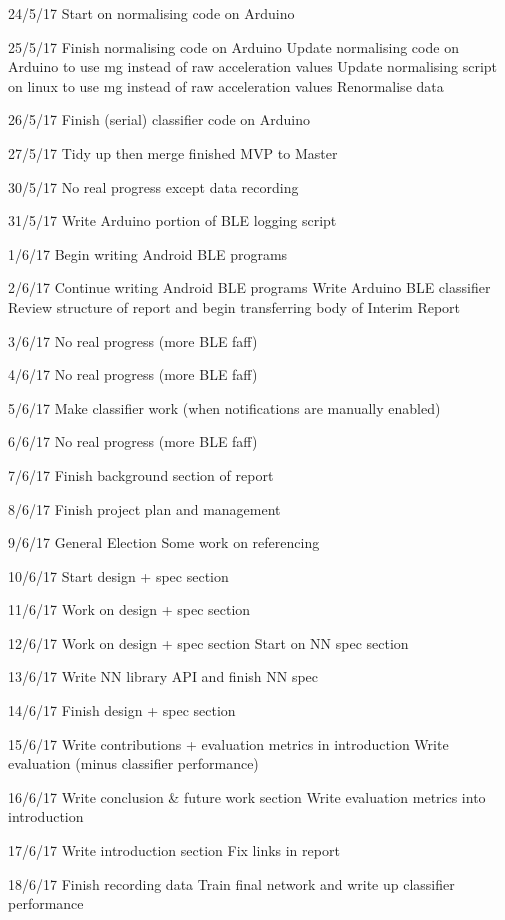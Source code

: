 \documentclass[a4paper]{article}
\begin{document}
24/5/17
    Start on normalising code on Arduino

25/5/17
    Finish normalising code on Arduino
    Update normalising code on Arduino to use mg instead of raw acceleration values
    Update normalising script on linux to use mg instead of raw acceleration values
    Renormalise data

26/5/17
    Finish (serial) classifier code on Arduino

27/5/17
    Tidy up then merge finished MVP to Master

30/5/17
    No real progress except data recording

31/5/17
    Write Arduino portion of BLE logging script

1/6/17
    Begin writing Android BLE programs

2/6/17
    Continue writing Android BLE programs
    Write Arduino BLE classifier
    Review structure of report and begin transferring body of Interim Report

3/6/17
    No real progress (more BLE faff)

4/6/17
    No real progress (more BLE faff)

5/6/17
    Make classifier work (when notifications are manually enabled)

6/6/17
    No real progress (more BLE faff)

7/6/17
    Finish background section of report

8/6/17
    Finish project plan and management

9/6/17
    General Election
    Some work on referencing
    
10/6/17
    Start design + spec section

11/6/17
    Work on design + spec section

12/6/17
    Work on design + spec section
    Start on NN spec section

13/6/17
    Write NN library API and finish NN spec

14/6/17
    Finish design + spec section

15/6/17
    Write contributions + evaluation metrics in introduction
    Write evaluation (minus classifier performance)

16/6/17
    Write conclusion \& future work section
    Write evaluation metrics into introduction

17/6/17
    Write introduction section
    Fix links in report

18/6/17
    Finish recording data
    Train final network and write up classifier performance
\end{document}
